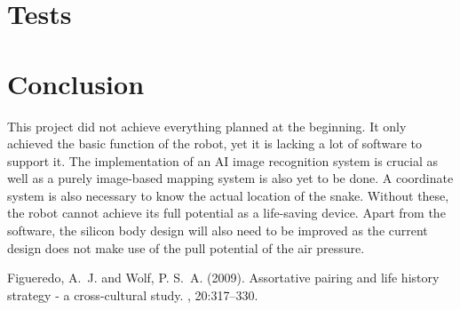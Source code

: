 \documentclass[twoside]{article}
\begin{document}
\section{Tests}
\blindtext
{}

\section{Conclusion}
This project did not achieve everything planned at the beginning. It only achieved the basic function of the robot, yet it is lacking a lot of software to support it. The implementation of an AI image recognition system is crucial as well as a purely image-based mapping system is also yet to be done. A coordinate system is also necessary to know the actual location of the snake. Without these, the robot cannot achieve its full potential as a life-saving device. Apart from the software, the silicon body design will also need to be improved as the current design does not make use of the pull potential of the air pressure.




\begin{thebibliography}{99} %

Figueredo, A.~J. and Wolf, P. S.~A. (2009).
\newblock Assortative pairing and life history strategy - a cross-cultural
  study.
, 20:317--330.
 
\end{thebibliography}

\end{document}
